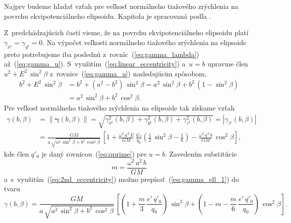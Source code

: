 \documentclass[a4paper, 12pt]{book}
\begin{document}
Najprv budeme hľadať vzťah pre veľkosť normálneho tiažového zrýchlenia na 
povrchu ekvipotenciálneho elipsoidu.  Kapitola je spracovaná podľa 
\textcite{MoritzPhysicalGeodesy}.

Z~predchádzajúcich častí vieme, že na povrchu ekvipotenciálneho elipsoidu 
platí~$\gamma_{x^\mathrm{r}} = \gamma_{y^\mathrm{r}} = 0$.  Na výpočet veľkosti 
normálneho tiažového zrýchlenia na elipsoide preto potrebujeme iba poslednú 
z~rovníc~(\ref{eq:gamma_lambda}) až~(\ref{eq:gamma_u}).  
S~využitím~(\ref{eq:linear_eccentricity}) a~$u = b$ upravme člen~$u^2 + E^2 \, 
\sin^2\beta$ z~rovnice~(\ref{eq:gamma_u}) nasledujúcim spôsobom,
%
\begin{equation}
\begin{split}
b^2 + E^2 \, \sin^2\beta &= b^2 + (a^2 - b^2) \, \sin^2\beta = a^2 \, 
\sin^2\beta + b^2 \, (1 - \sin^2\beta)\\
%
&= a^2 \, \sin^2\beta + b^2 \, \cos^2\beta{.}
\end{split}
\end{equation}
%
Pre veľkosť normálneho tiažového zrýchlenia na elipsoide tak získame vzťah
%
\begin{equation}
\label{eq:gamma_ell_1}
\begin{split}
\gamma(b, \beta) &= \| \boldsymbol \gamma(b, \beta) \| 
= \sqrt{\gamma^2_{x^\mathrm{r}}(b, \beta) + \gamma^2_{y^\mathrm{r}}(b, \beta) 
+ \gamma^2_{z^\mathrm{r}}(b, \beta)} = | \gamma_{z^\mathrm{r}}(b, \beta) |\\
%
&= \frac{GM}{a \, \sqrt{a^2 \, \sin^2\beta + b^2 \, \cos^2\beta}} \, \left[ 
1 + \frac{\omega^2 \, a^2 \, E}{GM} \, \frac{q'_0}{q_0} \left( \frac{1}{2} \, 
\sin^2\beta - \frac{1}{6} \right) - \frac{\omega^2 \, a^2 \, b}{GM} \, 
\cos^2\beta \right]
{,}
\end{split}
\end{equation}
%
kde člen $q'_0$ je daný rovnicou~(\ref{eq:qprime}) pre $u = b$.  Zavedením 
substitúcie
%
\begin{equation}
m = \frac{\omega^2 \, a^2 \, b}{GM}
\end{equation}
%
a~s~využitím~(\ref{eq:2nd_eccentricity}) možno prepísať~(\ref{eq:gamma_ell_1}) 
do tvaru
%
\begin{equation}
\label{eq:gamma_ell_2}
\gamma(b, \beta) = \frac{GM}{a \, \sqrt{a^2 \, \sin^2\beta + b^2 \, 
\cos^2\beta}} \, \left[ \left( 1 + \frac{m}{3} \, \frac{e' \, q'_0}{q_0} 
\right) \, \sin^2\beta + \left( 1 - m - \frac{m}{6} \, \frac{e' \, q'_0}{q_0} 
\right) \, \cos^2\beta
\right]{.}
\end{equation}
\end{document}
